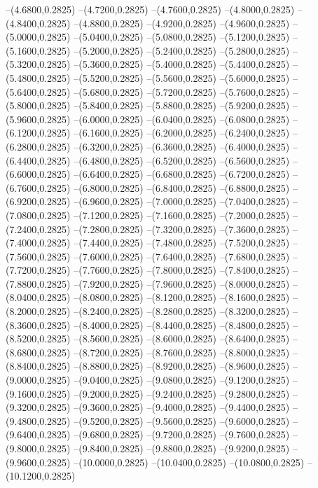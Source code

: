 {	--(4.6800,0.2825)
	--(4.7200,0.2825)
	--(4.7600,0.2825)
	--(4.8000,0.2825)
	--(4.8400,0.2825)
	--(4.8800,0.2825)
	--(4.9200,0.2825)
	--(4.9600,0.2825)
	--(5.0000,0.2825)
	--(5.0400,0.2825)
	--(5.0800,0.2825)
	--(5.1200,0.2825)
	--(5.1600,0.2825)
	--(5.2000,0.2825)
	--(5.2400,0.2825)
	--(5.2800,0.2825)
	--(5.3200,0.2825)
	--(5.3600,0.2825)
	--(5.4000,0.2825)
	--(5.4400,0.2825)
	--(5.4800,0.2825)
	--(5.5200,0.2825)
	--(5.5600,0.2825)
	--(5.6000,0.2825)
	--(5.6400,0.2825)
	--(5.6800,0.2825)
	--(5.7200,0.2825)
	--(5.7600,0.2825)
	--(5.8000,0.2825)
	--(5.8400,0.2825)
	--(5.8800,0.2825)
	--(5.9200,0.2825)
	--(5.9600,0.2825)
	--(6.0000,0.2825)
	--(6.0400,0.2825)
	--(6.0800,0.2825)
	--(6.1200,0.2825)
	--(6.1600,0.2825)
	--(6.2000,0.2825)
	--(6.2400,0.2825)
	--(6.2800,0.2825)
	--(6.3200,0.2825)
	--(6.3600,0.2825)
	--(6.4000,0.2825)
	--(6.4400,0.2825)
	--(6.4800,0.2825)
	--(6.5200,0.2825)
	--(6.5600,0.2825)
	--(6.6000,0.2825)
	--(6.6400,0.2825)
	--(6.6800,0.2825)
	--(6.7200,0.2825)
	--(6.7600,0.2825)
	--(6.8000,0.2825)
	--(6.8400,0.2825)
	--(6.8800,0.2825)
	--(6.9200,0.2825)
	--(6.9600,0.2825)
	--(7.0000,0.2825)
	--(7.0400,0.2825)
	--(7.0800,0.2825)
	--(7.1200,0.2825)
	--(7.1600,0.2825)
	--(7.2000,0.2825)
	--(7.2400,0.2825)
	--(7.2800,0.2825)
	--(7.3200,0.2825)
	--(7.3600,0.2825)
	--(7.4000,0.2825)
	--(7.4400,0.2825)
	--(7.4800,0.2825)
	--(7.5200,0.2825)
	--(7.5600,0.2825)
	--(7.6000,0.2825)
	--(7.6400,0.2825)
	--(7.6800,0.2825)
	--(7.7200,0.2825)
	--(7.7600,0.2825)
	--(7.8000,0.2825)
	--(7.8400,0.2825)
	--(7.8800,0.2825)
	--(7.9200,0.2825)
	--(7.9600,0.2825)
	--(8.0000,0.2825)
	--(8.0400,0.2825)
	--(8.0800,0.2825)
	--(8.1200,0.2825)
	--(8.1600,0.2825)
	--(8.2000,0.2825)
	--(8.2400,0.2825)
	--(8.2800,0.2825)
	--(8.3200,0.2825)
	--(8.3600,0.2825)
	--(8.4000,0.2825)
	--(8.4400,0.2825)
	--(8.4800,0.2825)
	--(8.5200,0.2825)
	--(8.5600,0.2825)
	--(8.6000,0.2825)
	--(8.6400,0.2825)
	--(8.6800,0.2825)
	--(8.7200,0.2825)
	--(8.7600,0.2825)
	--(8.8000,0.2825)
	--(8.8400,0.2825)
	--(8.8800,0.2825)
	--(8.9200,0.2825)
	--(8.9600,0.2825)
	--(9.0000,0.2825)
	--(9.0400,0.2825)
	--(9.0800,0.2825)
	--(9.1200,0.2825)
	--(9.1600,0.2825)
	--(9.2000,0.2825)
	--(9.2400,0.2825)
	--(9.2800,0.2825)
	--(9.3200,0.2825)
	--(9.3600,0.2825)
	--(9.4000,0.2825)
	--(9.4400,0.2825)
	--(9.4800,0.2825)
	--(9.5200,0.2825)
	--(9.5600,0.2825)
	--(9.6000,0.2825)
	--(9.6400,0.2825)
	--(9.6800,0.2825)
	--(9.7200,0.2825)
	--(9.7600,0.2825)
	--(9.8000,0.2825)
	--(9.8400,0.2825)
	--(9.8800,0.2825)
	--(9.9200,0.2825)
	--(9.9600,0.2825)
	--(10.0000,0.2825)
	--(10.0400,0.2825)
	--(10.0800,0.2825)
	--(10.1200,0.2825)
}
